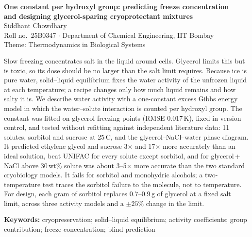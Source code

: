 \documentclass[10pt,a4paper]{article}
\begin{document}
\begin{center}
{\Large\bfseries One constant per hydroxyl group: predicting freeze concentration\\[2pt]
and designing glycerol-sparing cryoprotectant mixtures}\\[7pt]
{\normalsize Siddhant Chowdhary}\\[1pt]
{\small Roll no.\ 25B0347 \quad $\cdot$ \quad Department of Chemical Engineering, IIT Bombay}\\[1pt]
{\small\color{mid}Theme: Thermodynamics in Biological Systems}
\end{center}
\vspace{1pt}

\begin{tcolorbox}[colback=white,colframe=black,boxrule=0.5pt,arc=1pt,left=7pt,right=7pt,top=4pt,bottom=4pt,
  title=Abstract,fonttitle=\bfseries\small,colbacktitle=black,coltitle=white]
\small
Slow freezing concentrates salt in the liquid around cells. Glycerol limits this but is toxic, so its dose
should be no larger than the salt limit requires. Because ice is pure water, solid--liquid equilibrium fixes
the water activity of the unfrozen liquid at each temperature; a recipe changes only how much liquid remains
and how salty it is. We describe water activity with a one-constant excess Gibbs energy model in which the
water--solute interaction is counted per hydroxyl group. The constant was fitted on glycerol freezing points
(RMSE 0.017\,K), fixed in version control, and tested without refitting against independent literature data:
11 solutes, sorbitol and sucrose at 25\,\textdegree C, and the glycerol--NaCl--water phase diagram. It predicted
ethylene glycol and sucrose 3$\times$ and 17$\times$ more accurately than an ideal solution, beat UNIFAC for every
solute except sorbitol, and for glycerol\,+\,NaCl above 30\,wt\% solute was about 3--5$\times$ more accurate than
the two standard cryobiology models. It fails for sorbitol and monohydric alcohols; a two-temperature test
traces the sorbitol failure to the molecule, not to temperature. For design, each gram of sorbitol replaces
0.7--0.9\,g of glycerol at a fixed salt limit, across three activity models and a $\pm25\%$ change in the limit.
\end{tcolorbox}

{\small\textbf{Keywords:} cryopreservation; solid--liquid equilibrium; activity coefficients; group
contribution; freeze concentration; blind prediction}
\end{document}
